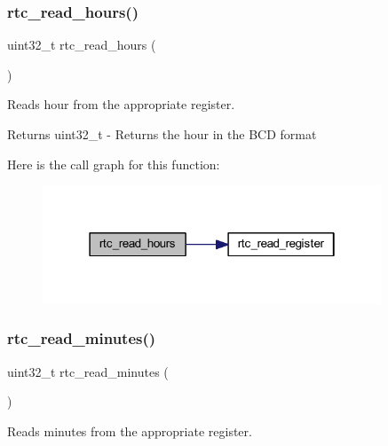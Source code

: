 \subsubsection{\texorpdfstring{rtc\+\_\+read\+\_\+hours()}{rtc\_read\_hours()}}
{\footnotesize\ttfamily uint32\+\_\+t rtc\+\_\+read\+\_\+hours (\begin{DoxyParamCaption}{ }\end{DoxyParamCaption})}



Reads hour from the appropriate register. 

\begin{DoxyReturn}{Returns}
uint32\+\_\+t -\/ Returns the hour in the B\+CD format 
\end{DoxyReturn}
Here is the call graph for this function\+:
\nopagebreak
\begin{figure}[H]
\begin{center}
\leavevmode
\includegraphics[width=286pt]{group__rtc_ga512adcbde067ca5bb83b1af0e0a7a444_cgraph}
\end{center}
\end{figure}
\mbox{\label{group__rtc_gaac43b2266aa06ad5a572d0fa3976ebb0}} 
\subsubsection{\texorpdfstring{rtc\+\_\+read\+\_\+minutes()}{rtc\_read\_minutes()}}
{\footnotesize\ttfamily uint32\+\_\+t rtc\+\_\+read\+\_\+minutes (\begin{DoxyParamCaption}{ }\end{DoxyParamCaption})}



Reads minutes from the appropriate register. 

